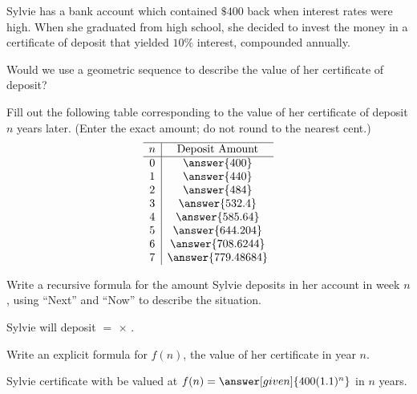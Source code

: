 \documentclass[nooutcomes]{ximera}
\begin{document}
\begin{problem}
Sylvie has a bank account which contained $\$400$ back when interest rates were high.  When she graduated from high school, she decided to invest the money in a certificate of deposit that yielded $10\%$ interest, compounded annually.  

Would we use a geometric sequence to describe the value of her certificate of deposit?
\begin{multipleChoice}
\end{multipleChoice}

\begin{problem}
Fill out the following table corresponding to the value of her certificate of deposit $n$ years later. (Enter the exact amount; do not round to the nearest cent.)
\[
\begin{array}{c|c} \hline
n & \text{Deposit Amount} \\ \hline
0 & \answer{400}\\
1 & \answer{440} \\
2 & \answer{484} \\
3 & \answer{532.4}\\
4 & \answer{585.64}\\
5 & \answer{644.204}\\
6 & \answer{708.6244}\\
7 & \answer{779.48684}\\
\end{array}
\]

\begin{problem}
Write a recursive formula for the amount Sylvie deposits in her account in week $n$, using ``Next'' and ``Now'' to describe the situation.

\begin{prompt}
Sylvie will deposit  $=$   $\times$  .
\end{prompt}


\begin{problem}

Write an explicit formula for $f(n)$, the value of her certificate in year $n$.

\begin{prompt}
Sylvie certificate with be valued at $f(n) = \answer[given]{400(1.1)^n}$ in $n$ years.
\end{prompt}

\end{problem}

\end{problem}

\end{problem}

\end{problem}
\end{document}
